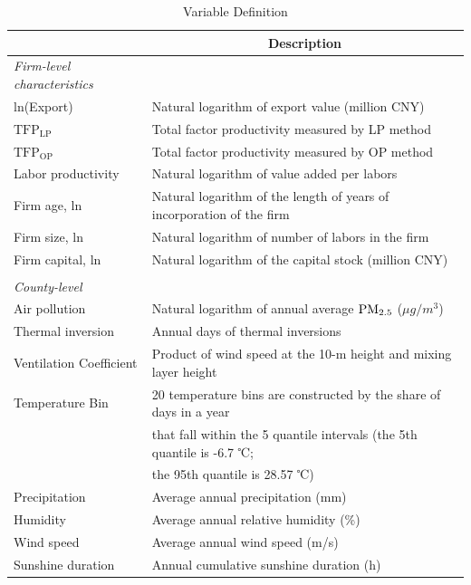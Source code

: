 \documentclass[12pt]{article}
\begin{document}
\newpage
\small



\newpage
\begin{table}[H]\centering
  \caption{Variable Definition}\label{tab:var_definition}
  \footnotesize
  \begin{tabular}{l*{1}{l}}
    \hline\hline
    &\multicolumn{1}{c}{Description}\\    
    \hline
    \textit{Firm-level characteristics} \\
    ln(Export)	& Natural logarithm of export value (million CNY) \\
    $\mathrm{TFP_{LP}}$	&Total factor productivity measured by LP method \\
    $\mathrm{TFP_{OP}}$	&Total factor productivity measured by OP method \\
    Labor productivity & Natural logarithm of value added per labors \\
    Firm age, ln 	& Natural logarithm of the length of years of incorporation of the firm\\
    Firm size, ln	& Natural logarithm of number of labors in the firm \\
    Firm capital, ln	& Natural logarithm of the capital stock (million CNY) \\
                       &\\
    \textit{County-level} &\\    
    Air pollution       &Natural logarithm of annual average $\rm PM_{2.5}$ ($\mu g/m^3$) \\
    Thermal inversion	&Annual days of thermal inversions\\
    Ventilation Coefficient & Product of wind speed at the 10-m height and mixing layer height\\
    Temperature Bin     &20 temperature bins are constructed by the share of days in a year \\
                        &that fall within the 5 quantile intervals (the 5th quantile is -6.7 ℃;\\
                        &the 95th quantile is 28.57 ℃)\\
    Precipitation       &Average annual precipitation (mm)\\
    Humidity            &Average annual relative humidity (\%)\\
    Wind speed          &Average annual wind speed (m/s)\\
    Sunshine duration   &Annual cumulative sunshine duration (h)\\
    \hline\hline
  \end{tabular}
\end{table}
\end{document}
